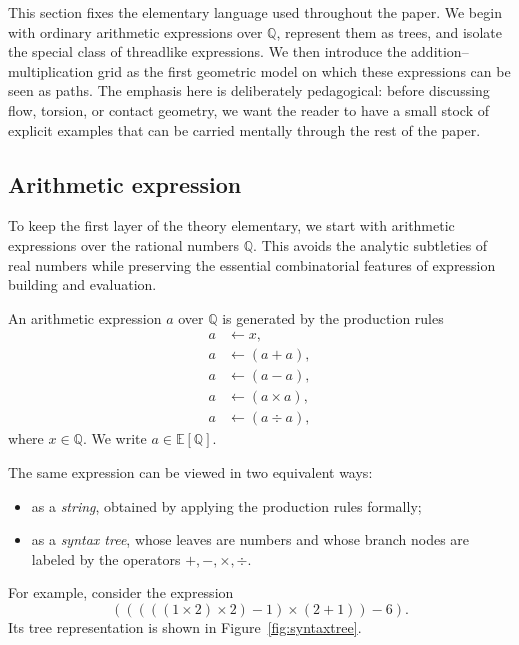 This section fixes the elementary language used throughout the paper. We begin with ordinary arithmetic expressions over $\mathbb{Q}$, represent them as trees, and isolate the special class of threadlike expressions. We then introduce the addition--multiplication grid as the first geometric model on which these expressions can be seen as paths. The emphasis here is deliberately pedagogical: before discussing flow, torsion, or contact geometry, we want the reader to have a small stock of explicit examples that can be carried mentally through the rest of the paper.

\subsection{Arithmetic expression}\label{subsec:arithmetic-expression}

To keep the first layer of the theory elementary, we start with arithmetic expressions over the rational numbers $\mathbb{Q}$. This avoids the analytic subtleties of real numbers while preserving the essential combinatorial features of expression building and evaluation.

\begin{definition}\label{def:arithmetic-expression}
An arithmetic expression $a$ over $\mathbb{Q}$ is generated by the production rules
\begin{equation}\label{eq:productionrule}
\begin{aligned}
a &\longleftarrow x, \\
a &\longleftarrow (a+a), \\
a &\longleftarrow (a-a), \\
a &\longleftarrow (a\times a), \\
a &\longleftarrow (a\div a),
\end{aligned}
\end{equation}
where $x\in\mathbb{Q}$. We write $a\in \mathbb{E}[\mathbb{Q}]$.
\end{definition}

The same expression can be viewed in two equivalent ways:
\begin{itemize}
    \item as a \emph{string}, obtained by applying the production rules formally;
    \item as a \emph{syntax tree}, whose leaves are numbers and whose branch nodes are labeled by the operators $+, -, \times, \div$.
\end{itemize}

For example, consider the expression
\begin{equation}
(((((1 \times 2) \times 2) - 1) \times (2 + 1)) - 6).
\label{eq:equation}
\end{equation}
Its tree representation is shown in Figure~\ref{fig:syntaxtree}.

